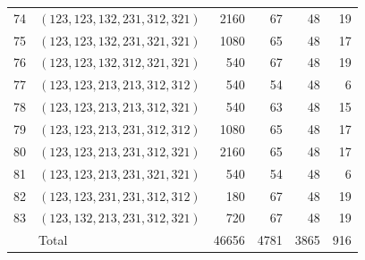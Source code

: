 \documentclass[a4paper,11pt]{amsart}
\numberwithin{equation}{section}
\theoremstyle{definition}
\theoremstyle{remark}
\begin{document}
{\begin{longtable}{@{}rlrrrr@{}}
74 & $(123,123,132,231,312,321)$ & 2160 & 67 & 48 & 19\\
75 & $(123,123,132,231,321,321)$ & 1080 & 65 & 48 & 17\\
76 & $(123,123,132,312,321,321)$ & 540 & 67 & 48 & 19\\
77 & $(123,123,213,213,312,312)$ & 540 & 54 & 48 & 6\\
78 & $(123,123,213,213,312,321)$ & 540 & 63 & 48 & 15\\
79 & $(123,123,213,231,312,312)$ & 1080 & 65 & 48 & 17\\
80 & $(123,123,213,231,312,321)$ & 2160 & 65 & 48 & 17\\
81 & $(123,123,213,231,321,321)$ & 540 & 54 & 48 & 6\\
82 & $(123,123,231,231,312,312)$ & 180 & 67 & 48 & 19\\
83 & $(123,132,213,231,312,321)$ & 720 & 67 & 48 & 19\\
\midrule
 & Total & 46656 & 4781 & 3865 & 916\\
\end{longtable}
}
\end{document}
